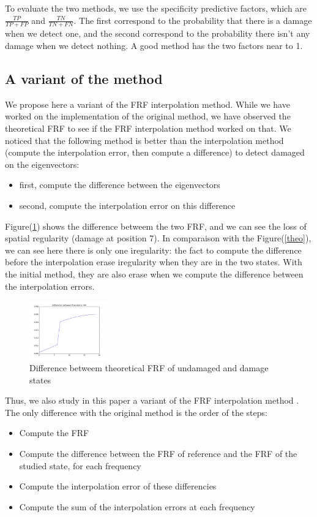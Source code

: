 \documentclass[journal]{IEEEtran}
\begin{document}
To evaluate the two methods, we use the specificity predictive factors, which are 
$\frac{TP}{TP + FP}$ and $\frac{TN}{TN + FN}$. The first correspond to the probability that there is a damage when we detect one, and the second correspond to the probability there isn't any damage when we detect nothing. A good method has the two factors near to 1.


\subsection{A variant of the method}

We propose here a variant of the FRF interpolation method. While we have worked on the implementation of the original method, we have observed the theoretical FRF to see if the FRF interpolation method worked on that. We noticed that the following method is better than the interpolation method (compute the interpolation error, then compute a difference) to detect damaged on the eigenvectors:
\begin{itemize}
\item first, compute the difference between the eigenvectors
\item second, compute the interpolation error on this difference
\end{itemize}

Figure(\ref{theodiff}) shows the difference betweem the two FRF, and we can see the loss of spatial regularity (damage at position 7).
In comparaison with the Figure(\ref{theo}), we can see here there is only one iregularity: the fact to compute the difference before the interpolation erase iregularity when they are in the two states. With the initial method, they are also erase when we compute the difference between the interpolation errors.

\begin{figure}[h!]
  \centering
  \includegraphics[width=0.3\textwidth]{images/theodiff60.png}
  \caption{Difference betweem theoretical FRF of undamaged and damage states}
  \label{theodiff}
\end{figure}


Thus, we also study in this paper a variant of the FRF interpolation method . The only difference with the original method is the order of the steps:
\begin{itemize}
\item Compute the FRF
\item Compute the difference between the FRF of reference and the FRF of the studied state, for each frequency
\item Compute the interpolation error of these differencies
\item Compute the sum of the interpolation errors at each frequency
\end{itemize}
\end{document}
